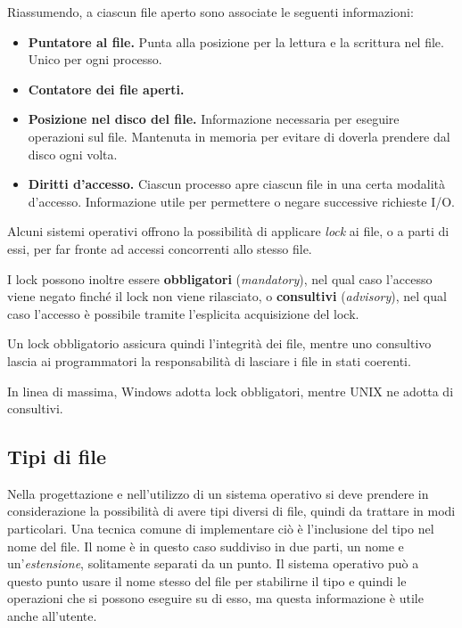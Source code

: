         Riassumendo, a ciascun file aperto sono associate le seguenti informazioni:
        \begin{itemize}
            \item \textbf{Puntatore al file.} Punta alla posizione per la lettura e la scrittura nel file. Unico per ogni processo.
            
            \item \textbf{Contatore dei file aperti.} 
            
            \item \textbf{Posizione nel disco del file.} Informazione necessaria per eseguire operazioni sul file. Mantenuta in memoria per evitare di doverla prendere dal disco ogni volta.
            
            \item \textbf{Diritti d'accesso.} Ciascun processo apre ciascun file in una certa modalità d'accesso. Informazione utile per permettere o negare successive richieste I/O.
        \end{itemize}
        
        Alcuni sistemi operativi offrono la possibilità di applicare \textit{lock} ai file, o a parti di essi, per far fronte ad accessi concorrenti allo stesso file.
        
        I lock possono inoltre essere \textbf{obbligatori} (\textit{mandatory}), nel qual caso l'accesso viene negato finché il lock non viene rilasciato, o \textbf{consultivi} (\textit{advisory}), nel qual caso l'accesso è possibile tramite l'esplicita acquisizione del lock.
        
        Un lock obbligatorio assicura quindi l'integrità dei file, mentre uno consultivo lascia ai programmatori la responsabilità di lasciare i file in stati coerenti.
        
        In linea di massima, Windows adotta lock obbligatori, mentre UNIX ne adotta di consultivi.
        
    \subsection{Tipi di file}
        Nella progettazione e nell'utilizzo di un sistema operativo si deve prendere in considerazione la possibilità di avere tipi diversi di file, quindi da trattare in modi particolari. Una tecnica comune di implementare ciò è l'inclusione del tipo nel nome del file. Il nome è in questo caso suddiviso in due parti, un nome e un'\textit{estensione}, solitamente separati da un punto. Il sistema operativo può a questo punto usare il nome stesso del file per stabilirne il tipo e quindi le operazioni che si possono eseguire su di esso, ma questa informazione è utile anche all'utente.
        
